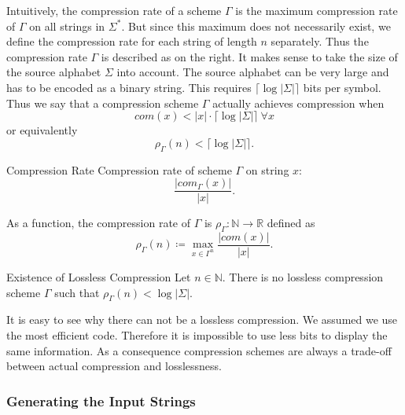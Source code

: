 \documentclass[english]{panikzettel}
\begin{document}
\begin{halfboxl}
\vspace{-\baselineskip}
	Intuitively, the compression rate of a scheme $\Gamma$ is the maximum compression rate of $\Gamma$ on all strings in $\Sigma^*$. But since this maximum does not necessarily exist, we define the compression rate for each string of length $n$ separately. Thus the compression rate $\Gamma$ is described as on the right.
	It makes sense to take the size of the source alphabet $\Sigma$ into account. The source alphabet can be very large and has to be encoded as a binary string. This requires $\lceil\log |\Sigma|\rceil$ bits per symbol.\\
	Thus we say that a compression scheme $\Gamma$ actually achieves compression when
	\[
	com(x)<|x| \cdot \lceil \log |\Sigma| \rceil \ \forall x
	\]
	or equivalently
	\[
	\rho_\Gamma(n)<\lceil \log|\Sigma| \rceil.
	\]
\end{halfboxl}
\begin{halfboxr}
\vspace{-\baselineskip}
	\begin{defi}{Compression Rate}
	Compression rate of scheme $\Gamma$ on string $x$:
	\vspace{-0.5\baselineskip}
	\[
	\frac{|com_\Gamma(x)|}{|x|}.
	\]

	As a function, the compression rate of $\Gamma$ is $\rho_\Gamma:\mathbb{N}\to \mathbb{R}$ defined as
	\vspace{-0.5\baselineskip}
	\[
	\rho_\Gamma(n)\coloneqq \max_{x\in\Gamma^n}\frac{|com(x)|}{|x|}.
	\]
	\end{defi}

	\begin{theo}{Existence of Lossless Compression}
	Let $n\in\mathbb{N}$. There is no lossless compression scheme $\Gamma$ such that $\rho_\Gamma(n)<\log |\Sigma|$.
	\end{theo}
\end{halfboxr}

It is easy to see why there can not be a lossless compression. We assumed we use the most efficient code. Therefore it is impossible to use less bits to display the same information. As a consequence compression schemes are always a trade-off between actual compression and losslessness. %

\subsubsection{Generating the Input Strings}
\end{document}
